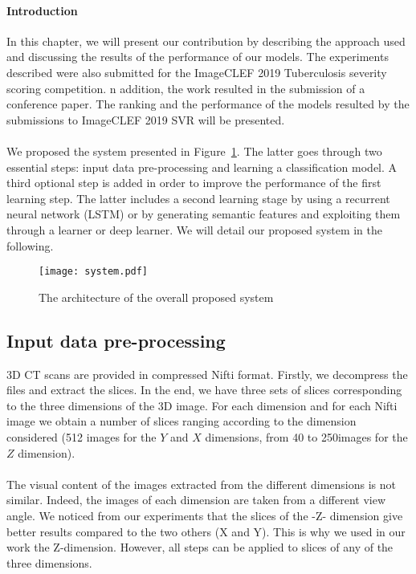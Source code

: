 \paragraph{Introduction}
In this chapter, we will present our contribution by describing the approach used and discussing the results of the performance of our models. The experiments described were also submitted for the ImageCLEF 2019 Tuberculosis severity scoring competition.  n addition, the work resulted in the submission of a conference paper. The ranking and the performance of the models resulted by the submissions to ImageCLEF 2019 SVR will be presented.

\paragraph{}
We proposed the system presented in Figure~\ref{fig:system}. The latter goes through two essential steps: input data pre-processing and learning a classification model. A third optional step is added in order to improve the performance of the first learning step. The latter includes a second learning stage by using a recurrent neural network (LSTM) or by generating semantic features and exploiting them through a learner or deep learner. We will detail our proposed system in the following.
\begin{figure}[h!]
\texttt{[image: system.pdf]}
\caption{The architecture of the overall proposed system} 
\label{fig:system}
\end{figure}

\subsection{Input data pre-processing}
\label{preprocess}
3D CT scans are provided in compressed Nifti format. Firstly, we decompress the files and extract the slices. In the end, we have three sets of slices corresponding to the three dimensions of the 3D image. For each dimension and for each Nifti image we obtain a number of slices ranging according to the dimension considered (512 images for the $Y$ and $X$ dimensions, from 40 to 250images for the $Z$ dimension).
\paragraph{}
The visual content of the images extracted from the different dimensions is not similar. Indeed, the images of each dimension are taken from a different view angle. We noticed from our experiments that the slices of the -Z- dimension give better results compared to the two others (X and Y). This is why we used in our work the Z-dimension. However, all steps can be applied to slices of any of the three dimensions.
